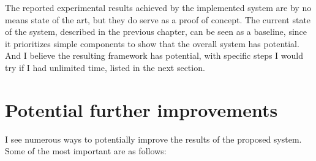 The reported experimental results achieved by the implemented system are by no means state of the art, but they do serve as a proof of concept.
The current state of the system, described in the previous chapter, can be seen as a baseline, since it prioritizes simple components to show that the overall system has potential.
And I believe the resulting framework has potential, with specific steps I would try if I had unlimited time, listed in the next section.

\section{Potential further improvements}

I see numerous ways to potentially improve the results of the proposed system.
Some of the most important are as follows:

